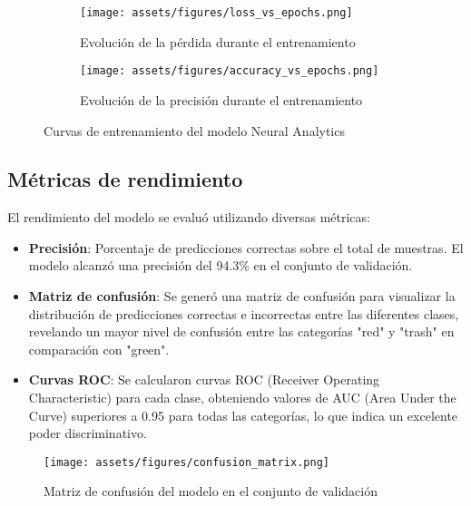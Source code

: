 \begin{figure}[ht]
    \centering
    \begin{subfigure}[b]{0.49\textwidth}
        \centering
        \texttt{[image: assets/figures/loss\_vs\_epochs.png]}
        \caption{Evolución de la pérdida durante el entrenamiento}
        \label{fig:loss_vs_epochs}
    \end{subfigure}
    \hfill
    \begin{subfigure}[b]{0.49\textwidth}
        \centering
        \texttt{[image: assets/figures/accuracy\_vs\_epochs.png]}
        \caption{Evolución de la precisión durante el entrenamiento}
        \label{fig:accuracy_vs_epochs}
    \end{subfigure}
    \caption{Curvas de entrenamiento del modelo Neural Analytics}
    \label{fig:training_curves}
\end{figure}

\newpage
\subsection{Métricas de rendimiento}

El rendimiento del modelo se evaluó utilizando diversas métricas:

\begin{itemize}
    \item \textbf{Precisión}: Porcentaje de predicciones correctas sobre el total de muestras. El modelo alcanzó una precisión del 94.3\% en el conjunto de validación.
    
    \item \textbf{Matriz de confusión}: Se generó una matriz de confusión para visualizar la distribución de predicciones correctas e incorrectas entre las diferentes clases, revelando un mayor nivel de confusión entre las categorías "red" y "trash" en comparación con "green".
    
    \item \textbf{Curvas ROC}: Se calcularon curvas ROC (Receiver Operating Characteristic) para cada clase, obteniendo valores de AUC (Area Under the Curve) superiores a 0.95 para todas las categorías, lo que indica un excelente poder discriminativo.
\end{itemize}

\begin{figure}[ht]
    \centering
    \texttt{[image: assets/figures/confusion\_matrix.png]}
    \caption{Matriz de confusión del modelo en el conjunto de validación}
    \label{fig:confusion_matrix}
\end{figure}

